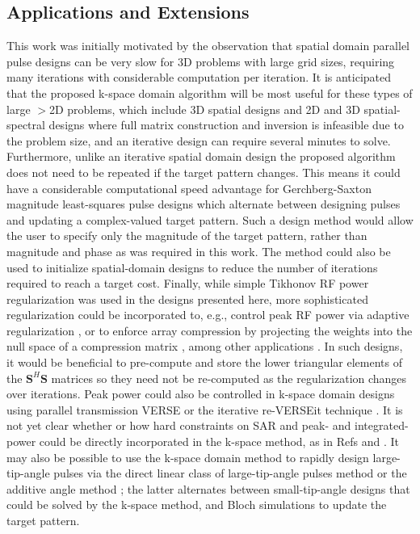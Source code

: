 \subsection*{Applications and Extensions}
This work was initially motivated by the observation that spatial domain parallel pulse designs can be very slow
for 3D problems with large grid sizes, 
requiring many iterations with considerable computation per iteration. 
It is anticipated that the proposed k-space domain algorithm will be most useful for these types of large $>$2D problems,
which include 3D spatial designs \cite{malik2012tailored,davids2016fast} 
and 2D and 3D spatial-spectral designs \cite{stenger2000three,setsompop2009,Malik:2010aa,yang2010four}
where full matrix construction and inversion is infeasible due to the problem size, 
and an iterative design can require several minutes to solve. 
Furthermore, unlike an iterative spatial domain design the proposed algorithm does not need to be repeated if the target pattern changes.
This means it could have a considerable computational speed advantage for Gerchberg-Saxton magnitude least-squares pulse designs \cite{setsompop2008magnitude,malik:mrm:2015}
which alternate between designing pulses and updating a complex-valued target pattern.
Such a design method would allow the user to specify only the magnitude of the target pattern, 
rather than magnitude and phase as was required in this work.
The method could also be used to initialize spatial-domain designs to reduce the number of iterations required to reach a target cost. 
Finally, while simple Tikhonov RF power regularization was used in the designs presented here,
more sophisticated regularization could be incorporated to, 
e.g., control peak RF power via adaptive regularization \cite{Yip:2005:Magn-Reson-Med:16155881},
or to enforce array compression by projecting the weights into the null space of a compression matrix \cite{cao2016array},
among other applications \cite{padormo:2016,deniz:2019}.
In such designs, it would be beneficial to pre-compute and store the lower triangular elements of the $\bm{S}^H\bm{S}$ matrices
so they need not be re-computed as the regularization changes over iterations.  
Peak power could also be controlled in k-space domain designs using parallel transmission 
VERSE \cite{Lee:2011:MRM} or the iterative re-VERSEit technique \cite{lee2009tod}.
It is not yet clear whether or how hard constraints on SAR and 
peak- and integrated-power could be directly incorporated in the k-space method, as in Refs \cite{brunner2010optimal} and \cite{hoyos:tmi:2014}.
It may also be possible to use the k-space domain method to rapidly design large-tip-angle pulses via the direct linear class of large-tip-angle pulses method \cite{Xu:2008aa} or the additive angle method \cite{grissom:mrm:2008}; 
the latter alternates between small-tip-angle designs that could be solved by the k-space method, 
and Bloch simulations to update the target pattern.


